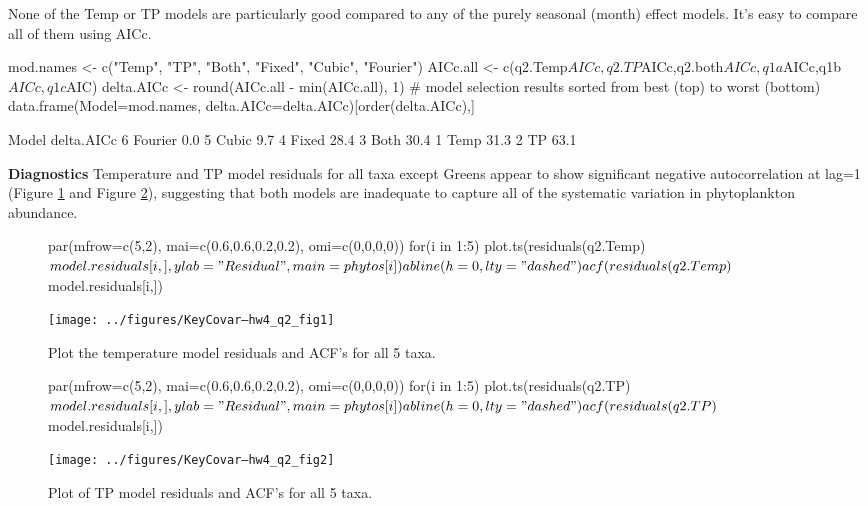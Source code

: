 None of the Temp or TP models are particularly good compared to any of the
purely seasonal (month) effect models. It's easy to compare all of them using AICc.
\begin{Schunk}
\begin{Sinput}
 mod.names <- c("Temp", "TP", "Both", "Fixed", "Cubic", "Fourier")
 AICc.all <- c(q2.Temp$AICc,q2.TP$AICc,q2.both$AICc,q1a$AICc,q1b$AICc,q1c$AIC)
 delta.AICc <- round(AICc.all - min(AICc.all), 1)
 # model selection results sorted from best (top) to worst (bottom)
 data.frame(Model=mod.names, delta.AICc=delta.AICc)[order(delta.AICc),]
\end{Sinput}
\begin{Soutput}
    Model delta.AICc
6 Fourier        0.0
5   Cubic        9.7
4   Fixed       28.4
3    Both       30.4
1    Temp       31.3
2      TP       63.1
\end{Soutput}
\end{Schunk}


{\bf Diagnostics} Temperature and TP model residuals for all taxa except Greens appear to show significant negative
autocorrelation at lag=1 (Figure \ref{fig.q3a} and Figure \ref{fig.q3b}), suggesting that both models are inadequate to
capture all of the systematic variation in phytoplankton abundance.

\begin{figure}[htp]
\label{fig.q3a}
\begin{center}
\begin{Schunk}
\begin{Sinput}
 par(mfrow=c(5,2), mai=c(0.6,0.6,0.2,0.2), omi=c(0,0,0,0))
 for(i in 1:5) {
   plot.ts(residuals(q2.Temp)$model.residuals[i,], ylab="Residual", main=phytos[i])
 	abline(h=0, lty="dashed")
 	acf(residuals(q2.Temp)$model.residuals[i,])
 	}
\end{Sinput}
\end{Schunk}
\texttt{[image: ../figures/KeyCovar--hw4\_q2\_fig1]}
\end{center}
\caption{Plot the temperature model residuals and ACF's for all 5 taxa.}
\end{figure}

\begin{figure}[htp]
\label{fig.q3b}
\begin{center}
\begin{Schunk}
\begin{Sinput}
 par(mfrow=c(5,2), mai=c(0.6,0.6,0.2,0.2), omi=c(0,0,0,0))
 for(i in 1:5) {
 	plot.ts(residuals(q2.TP)$model.residuals[i,], ylab="Residual", main=phytos[i])
 	abline(h=0, lty="dashed")
 	acf(residuals(q2.TP)$model.residuals[i,])
 	}
\end{Sinput}
\end{Schunk}
\texttt{[image: ../figures/KeyCovar--hw4\_q2\_fig2]}
\end{center}
\caption{Plot of TP model residuals and ACF's for all 5 taxa.}
\end{figure}

